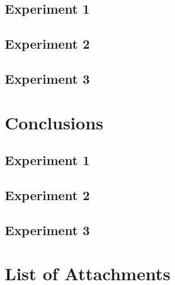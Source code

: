 \documentclass[a4paper]{article}
\begin{document}
\subsection{Experiment 1}
\lipsum[1]
\subsection{Experiment 2}
\lipsum[1]
\subsection{Experiment 3}
\lipsum[1]

\section{Conclusions}

\subsection{Experiment 1}
\lipsum[1]

\subsection{Experiment 2}
\lipsum[1]

\subsection{Experiment 3}
\lipsum[1]

\section{List of Attachments}
\listoffigures
\listoftables
\end{document}

